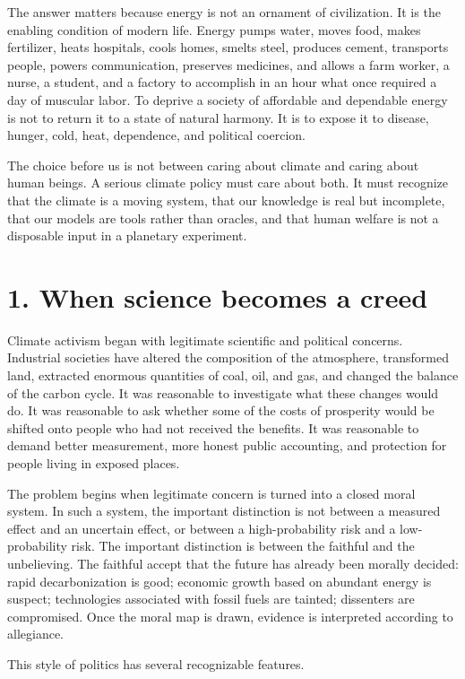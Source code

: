﻿\documentclass[12pt,a4paper]{book}
\begin{document}
The answer matters because energy is not an ornament of civilization. It is the enabling condition of modern life. Energy pumps water, moves food, makes fertilizer, heats hospitals, cools homes, smelts steel, produces cement, transports people, powers communication, preserves medicines, and allows a farm worker, a nurse, a student, and a factory to accomplish in an hour what once required a day of muscular labor. To deprive a society of affordable and dependable energy is not to return it to a state of natural harmony. It is to expose it to disease, hunger, cold, heat, dependence, and political coercion.

The choice before us is not between caring about climate and caring about human beings. A serious climate policy must care about both. It must recognize that the climate is a moving system, that our knowledge is real but incomplete, that our models are tools rather than oracles, and that human welfare is not a disposable input in a planetary experiment.

\section{1. When science becomes a creed}
Climate activism began with legitimate scientific and political concerns. Industrial societies have altered the composition of the atmosphere, transformed land, extracted enormous quantities of coal, oil, and gas, and changed the balance of the carbon cycle. It was reasonable to investigate what these changes would do. It was reasonable to ask whether some of the costs of prosperity would be shifted onto people who had not received the benefits. It was reasonable to demand better measurement, more honest public accounting, and protection for people living in exposed places.

The problem begins when legitimate concern is turned into a closed moral system. In such a system, the important distinction is not between a measured effect and an uncertain effect, or between a high-probability risk and a low-probability risk. The important distinction is between the faithful and the unbelieving. The faithful accept that the future has already been morally decided: rapid decarbonization is good; economic growth based on abundant energy is suspect; technologies associated with fossil fuels are tainted; dissenters are compromised. Once the moral map is drawn, evidence is interpreted according to allegiance.

This style of politics has several recognizable features.
\end{document}
